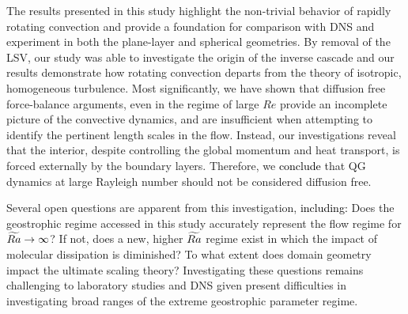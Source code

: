  

The results presented in this study highlight the non-trivial behavior of rapidly rotating convection and provide a foundation for comparison with DNS and experiment in both the plane-layer and spherical geometries. By removal of the LSV, our study was able to investigate the origin of the inverse cascade and our results demonstrate how rotating convection departs from the theory of isotropic, homogeneous turbulence. Most significantly, we have shown that diffusion free force-balance arguments, even in the regime of large $Re$ provide an incomplete picture of the convective dynamics, and are insufficient when attempting to identify the pertinent length scales in the flow. Instead, our investigations reveal that the interior, despite controlling the global momentum and heat transport, is forced externally by the boundary layers. 
Therefore, we \textcolor{black}{conclude} that QG dynamics at large Rayleigh number should not be considered diffusion free.

Several open questions are apparent from this investigation, \textcolor{black}{including:} Does the\\
geostrophic regime accessed in this study accurately represent the flow regime for $\widetilde{Ra} \to \infty$? If not, does a new, higher $\widetilde{Ra}$ regime exist in which the impact of molecular dissipation is diminished?
To what extent does domain geometry impact the ultimate scaling theory?
Investigating these questions remains challenging to laboratory studies and DNS given present difficulties in investigating broad ranges of the extreme geostrophic parameter regime. 










